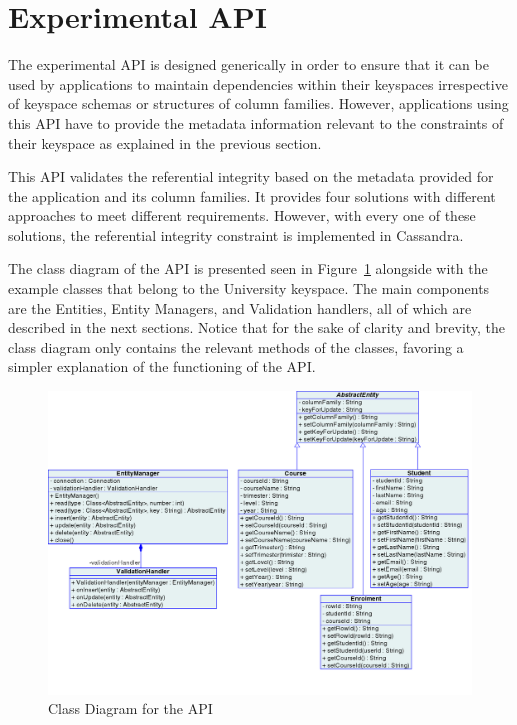 \section{Experimental API}\label{s:API}

The experimental \ac{API} is designed generically in order to ensure
that it can be used by  applications to maintain dependencies within their
keyspaces irrespective of keyspace schemas or structures of column
families. However, applications using this \ac{API}  have to provide
 the metadata information relevant to the constraints of their keyspace as
 explained in the previous section. 

This \ac{API} validates the referential integrity based on the metadata provided
for the application and its column families.  It  provides  four solutions
with different approaches to meet different requirements. However, with 
 every one of these solutions,  the referential integrity constraint is
 implemented in Cassandra.

The  class diagram of the \ac{API} is presented seen in
 Figure~\ref{f:classDiagram} alongside with the example classes that belong to 
the University keyspace. The main components are the Entities, Entity Managers,
and Validation handlers, all of which are described in the next sections.  
 Notice that for the sake of clarity and brevity,  the class diagram only
 contains  the relevant  methods of the classes, favoring a simpler
explanation of the functioning of the \ac{API}.

\begin{figure}[h]   
	\centering
	\includegraphics[width=\textwidth]{./figure/Solutions/FinalClassDiagram.png}
	\caption{Class Diagram for the \ac{API}}\label{f:classDiagram}
\end{figure}


